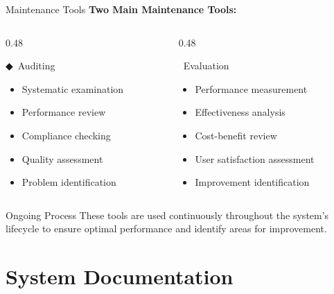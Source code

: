 \documentclass[aspectratio=169]{beamer}
\begin{document}
\begin{frame}{Maintenance Tools}
    \textbf{Two Main Maintenance Tools:}
    
    \begin{columns}
        \begin{column}{0.48\textwidth}
            \begin{block}{◆\, Auditing}
                \begin{itemize}
                    \item Systematic examination
                    \item Performance review
                    \item Compliance checking
                    \item Quality assessment
                    \item Problem identification
                \end{itemize}
            \end{block}
        \end{column}
        \begin{column}{0.48\textwidth}
            \begin{block}{\faFileExport\, Evaluation}
                \begin{itemize}
                    \item Performance measurement
                    \item Effectiveness analysis
                    \item Cost-benefit review
                    \item User satisfaction assessment
                    \item Improvement identification
                \end{itemize}
            \end{block}
        \end{column}
    \end{columns}
    
    \vspace{0.5cm}
    \begin{exampleblock}{Ongoing Process}
        These tools are used continuously throughout the system's lifecycle to ensure optimal performance and identify areas for improvement.
    \end{exampleblock}
\end{frame}

\section{System Documentation}
\end{document}

